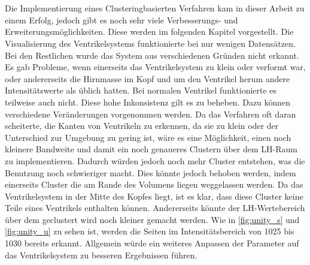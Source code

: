 \chapter{}
\label{sec:conclusion}



Die Implementierung eines Clusteringbasierten Verfahren kam in dieser Arbeit zu einem Erfolg, jedoch gibt es noch sehr viele Verbesserungs- und Erweiterungsmöglichkeiten. Diese werden im folgenden Kapitel vorgestellt.
\newline
Die Visualisierung des Ventrikelsystems funktionierte bei nur wenigen Datensätzen. Bei den Restlichen wurde das System aus verschiedenen Gründen nicht erkannt. Es gab Probleme, wenn einerseits das Ventrikelsystem zu klein oder verformt war, oder andererseits die Hirnmasse im Kopf und um den Ventrikel herum andere Intensitätswerte als üblich hatten. Bei normalen Ventrikel funktionierte es teilweise auch nicht. Diese hohe Inkonsistenz gilt es zu beheben. Dazu können verschiedene Veränderungen vorgenommen werden.
\newline
Da das Verfahren oft daran scheiterte, die Kanten von Ventrikeln zu erkennen, da sie zu klein oder der Unterschied zur Umgebung zu gering ist, wäre es eine Möglichkeit, einen noch kleinere Bandweite und damit ein noch genaueres Clustern über dem LH-Raum zu implementieren. Dadurch würden jedoch noch mehr Cluster entstehen, was die Benutzung noch schwieriger macht. Dies könnte jedoch behoben werden, indem einerseits Cluster die am Rande des Volumens liegen weggelassen werden. Da das Ventrikelsystem in der Mitte des Kopfes liegt, ist es klar, dass diese Cluster keine Teile eines Ventrikels enthalten können. Andererseits könnte der LH-Wertebereich über dem geclustert wird noch kleiner gemacht werden. Wie in \autoref{fig:unity_s} und \autoref{fig:unity_u} zu sehen ist, werden die Seiten im Intensitätsbereich von 1025 bis 1030 bereits erkannt. Allgemein würde ein weiteres Anpassen der Parameter auf das Ventrikelsystem zu besseren Ergebnissen führen.


